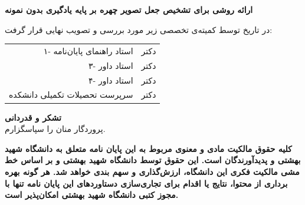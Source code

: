\begin{center}
	{\large
		\textbf{ارائه روشی برای تشخیص جعل تصویر چهره بر پایه یادگیری بدون نمونه}\\
	}
\end{center}
\vfill
\vspace*{1.8cm}
\quad \quad \quad
در تاریخ 			 توسط کمیته‌ی تخصصی زیر مورد بررسی و تصویب نهایی قرار گرفت:\\

{\normalsize
	
	\begin{tabular}{rr}
		\vspace*{.8cm}
		۱- استاد راهنمای پایان‌نامه  & \hspace{2cm}دکتر  \\
	
		\vspace{.8cm}
		۳- استاد داور  &\hspace{2cm}دکتر  \\
		\vspace{.8cm}
		۴- استاد داور  &\hspace{2cm}دکتر  \\
		\vspace{.8cm}
	
	
		سرپرست تحصیلات تکمیلی دانشکده &\hspace{2cm} دکتر \\
	\end{tabular}
}
\restoregeometry
\pagebreak

\thispagestyle{empty}
\vspace*{1.5cm}

{\large
	\textbf{تشکر و قدردانی}\\

پروردگار منان را سپاسگزارم.
}
\restoregeometry
\pagebreak

\thispagestyle{empty}

\begin{spacing}{3}
\leavevmode
\vfill
\parbox{8 cm}{

\textbf{\Large  کلیه حقوق مالکیت مادی و معنوی مربوط به اين پايان نامه متعلق به دانشگاه شهید بهشتی و پدیدآورندگان است. این حقوق توسط دانشگاه شهید بهشتی و بر اساس خط مشی مالکیت فکری این دانشگاه، ارزش‌گذاری و سهم بندی خواهد شد.
			هر گونه بهره برداری از محتوا، نتايج یا اقدام برای تجاری‌سازی دستاوردهای اين پايان نامه تنها با مجوز کتبی دانشگاه شهید بهشتی امکان‌پذیر است.}

}
\vfill
\end{spacing}
\restoregeometry
\pagebreak

